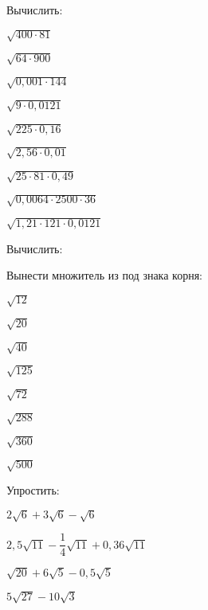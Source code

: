 %
\begin{class}[number=4]
	\begin{listofex}
		\item Вычислить:
		\begin{enumcols}[itemcolumns=3]
			\item \( \sqrt{400\cdot81} \)
			\item \( \sqrt{64\cdot900} \)
			\item \( \sqrt{0,001\cdot144} \)
			\item \( \sqrt{9\cdot0,0121} \)
			\item \( \sqrt{225\cdot0,16} \)
			\item \( \sqrt{2,56\cdot0,01} \)
			\item \( \sqrt{25\cdot81\cdot0,49} \)
			\item \( \sqrt{0,0064\cdot2500\cdot36} \)
			\item \( \sqrt{1,21\cdot121\cdot0,0121} \)
		\end{enumcols}
		\item Вычислить:
		\begin{enumcols}[itemcolumns=2]
			\item {}
			\item {}
		\end{enumcols}
		\item Вынести множитель из под знака корня:
		\begin{enumcols}[itemcolumns=8]
			\item \( \sqrt{12} \)
			\item \( \sqrt{20} \)
			\item \( \sqrt{40} \)
			\item \( \sqrt{125} \)
			\item \( \sqrt{72} \)
			\item \( \sqrt{288} \)
			\item \( \sqrt{360} \)
			\item \( \sqrt{500} \)
		\end{enumcols}
		\item Упростить:
		\begin{enumcols}[itemcolumns=3]
			\item \( 2\sqrt{6}+3\sqrt{6}-\sqrt{6} \)
			\item \( 2,5\sqrt{11}-\dfrac{1}{4}\sqrt{11}+0,36\sqrt{11} \)
			\item \( \sqrt{20}+6\sqrt{5}-0,5\sqrt{5} \)
			\item \( 5\sqrt{27}-10\sqrt{3} \)

\end{enumcols}
\end{listofex}
\end{class}
